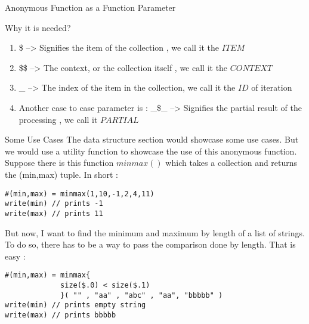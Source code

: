 \begin{section}{Anonymous Function as a Function Parameter}
\begin{subsection}{Why it is needed?}
\begin{enumerate}
\item{ \$ --> Signifies the item of the collection , we call it the $ITEM$ }
\item{ \$\$ --> The context, or the collection itself , we call it the $CONTEXT$} 
\item{ \_ --> The index of the item in the collection, we call it the $ID$ of iteration } 
\item{ Another case to case parameter is :
     \_\$\_ --> Signifies the partial result of the processing , we call it $PARTIAL$ }
\end{enumerate}

\end{subsection}

\begin{subsection}{Some Use Cases}
The data structure section would showcase some use cases. 
But we would use a utility function to showcase the use of this anonymous function.
Suppose there is this function $minmax()$  which takes a collection and returns the (min,max) tuple.
In short :

\begin{lstlisting}[style=JexlStyle]
#(min,max) = minmax(1,10,-1,2,4,11)
write(min) // prints -1
write(max) // prints 11    
\end{lstlisting}
But now, I want to find the minimum and maximum by length of a list of strings.
To do so, there has to be a way to pass the comparison done by length.
That is easy :

\begin{lstlisting}[style=JexlStyle]
#(min,max) = minmax{
             size($.0) < size($.1) 
             }( "" , "aa" , "abc" , "aa", "bbbbb" )
write(min) // prints empty string 
write(max) // prints bbbbb    
\end{lstlisting}

\end{subsection}

\end{section}

